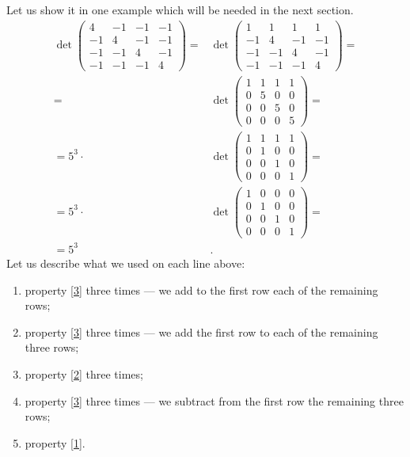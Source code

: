 Let us show it in one example which will be needed in the next section.
\begin{align*}
\det\left(
\begin{matrix}
4&-1&-1&-1
\\
-1&4&-1&-1
\\
-1&-1&4&-1
\\
-1&-1&-1&4
\end{matrix}
\right)
=
&\det\left(
\begin{matrix}
1&1&1&1
\\
-1&4&-1&-1
\\
-1&-1&4&-1
\\
-1&-1&-1&4
\end{matrix}
\right) 
=
\\
=
&\det\left(
\begin{matrix}
1&1&1&1
\\
0&5&0&0
\\
0&0&5&0
\\
0&0&0&5
\end{matrix}
\right)
=
\\
=
5^3\cdot
&\det\left(
\begin{matrix}
1&1&1&1
\\
0&1&0&0
\\
0&0&1&0
\\
0&0&0&1
\end{matrix}
\right)=
\\
=
5^3\cdot&\det\left(
\begin{matrix}
1&0&0&0
\\
0&1&0&0
\\
0&0&1&0
\\
0&0&0&1
\end{matrix}
\right)=
\\
=5^3&.
\end{align*}
Let us describe what we used on each line above:
\begin{enumerate}
\item property \ref{3} three times --- we add to the first row each of the remaining rows;
\item property \ref{3} three times --- we add the first row to each of the remaining three rows;
\item property \ref{2} three times;
\item property \ref{3} three times --- we subtract from the first row the remaining three rows;
\item property \ref{1}.
\end{enumerate}


